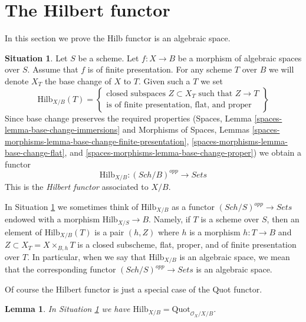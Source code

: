 \documentclass{stacks-project}
\theoremstyle{plain}
\newtheorem{lemma}[subsection]{Lemma}
\theoremstyle{definition}
\newtheorem{situation}[subsection]{Situation}
\theoremstyle{remark}
\numberwithin{equation}{subsection}
\def\Sch{\mathit{Sch}}
\def\Quotfunctor{\mathrm{Quot}}
\def\Hilbfunctor{\mathrm{Hilb}}
\begin{document}
\section{The Hilbert functor}
\label{section-hilb}

\noindent
In this section we prove the Hilb functor is an algebraic space.

\begin{situation}
\label{situation-hilb}
Let $S$ be a scheme. Let $f : X \to B$ be a morphism of
algebraic spaces over $S$. Assume that $f$ is of finite presentation.
For any scheme $T$ over $B$ we will denote $X_T$ the base change of
$X$ to $T$. Given such a $T$ we set
$$
\Hilbfunctor_{X/B}(T) =
\left\{
\begin{matrix}
\text{closed subspaces }Z \subset X_T\text{ such that }Z \to T\\
\text{is of finite presentation, flat, and proper}
\end{matrix}
\right\}
$$
Since base change preserves the required properties
(Spaces, Lemma \ref{spaces-lemma-base-change-immersions} and
Morphisms of Spaces, Lemmas
\ref{spaces-morphisms-lemma-base-change-finite-presentation},
\ref{spaces-morphisms-lemma-base-change-flat}, and
\ref{spaces-morphisms-lemma-base-change-proper})
we obtain a functor
\begin{equation}
\label{equation-hilb}
\Hilbfunctor_{X/B} : (\Sch/B)^{opp} \longrightarrow \textit{Sets}
\end{equation}
This is the {\it Hilbert functor} associated to $X/B$.
\end{situation}

\noindent
In Situation \ref{situation-hilb} we sometimes think of $\Hilbfunctor_{X/B}$
as a functor $(\Sch/S)^{opp} \to \textit{Sets}$ endowed with a morphism
$\Hilbfunctor_{X/S} \to B$. Namely, if $T$ is a scheme over $S$, then an element
of $\Hilbfunctor_{X/B}(T)$ is a pair $(h, Z)$
where $h$ is a morphism $h : T \to B$
and $Z \subset X_T = X \times_{B, h} T$
is a closed subscheme, flat, proper, and of finite
presentation over $T$. In particular, when we say
that $\Hilbfunctor_{X/B}$ is an algebraic space, we mean that the
corresponding functor $(\Sch/S)^{opp} \to \textit{Sets}$ is an algebraic space.

\medskip\noindent
Of course the Hilbert functor is just a special case of the
Quot functor.

\begin{lemma}
\label{lemma-hilb-is-quot}
In Situation \ref{situation-hilb} we have
$\Hilbfunctor_{X/B} = \Quotfunctor_{\mathcal{O}_X/X/B}$.
\end{lemma}
\end{document}
